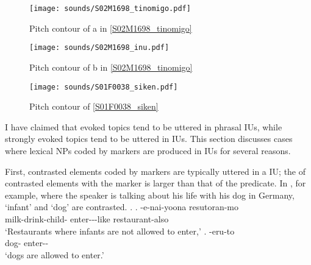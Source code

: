 \begin{figure}
	\begin{center}
	\texttt{[image: sounds/S02M1698\_tinomigo.pdf]}
	\caption{Pitch contour of a in \ref{S02M1698_tinomigo}}
	\label{S02M1698_tinomigoF}
	\end{center}
\end{figure}
\begin{figure}
	\begin{center}
	\texttt{[image: sounds/S02M1698\_inu.pdf]}
	\caption{Pitch contour of b in \ref{S02M1698_tinomigo}}
	\label{S02M1698_inuF}
	\end{center}
\end{figure}
\begin{figure}
	\begin{center}
	\texttt{[image: sounds/S01F0038\_siken.pdf]}
	\caption{Pitch contour of \ref{S01F0038_siken}}
	\label{S01F0038_sikenF}
	\end{center}
\end{figure}

I have claimed that
evoked topics tend to be uttered in phrasal IUs,
while strongly evoked topics tend to be uttered in  IUs.
This section discusses cases where
lexical NPs coded by  markers are produced in  IUs
for several reasons.

First, contrasted elements coded by  markers are typically uttered in a  IU;
the  of contrasted elements with the  marker  is larger than
that of the predicate.
In \Next, for example,
where the speaker is talking about his life with his dog in Germany,
 `infant' and  `dog' are contrasted.
%
\ex.\label{S02M1698_tinomigo}
 \ag.  -e-nai-yoona resutoran-mo \tp{\dvline} \\
 		milk-drink-child- enter---like restaurant-also {} \\
		`Restaurants where infants are not allowed to enter,'
 \bg.  -eru-to \tp{\dvline} \\
 		dog- enter-- {}\\
 		`dogs are allowed to enter.'

